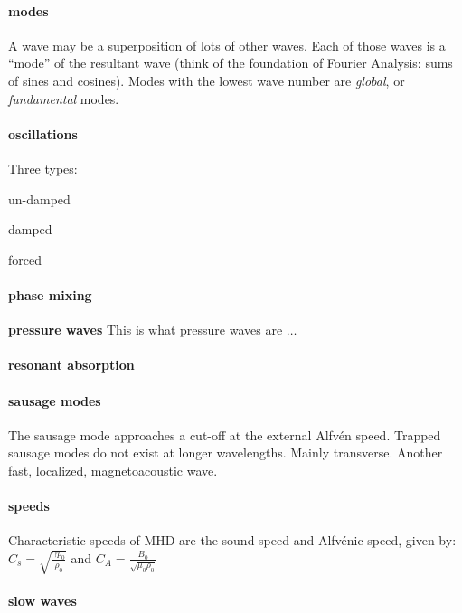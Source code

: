 \documentclass[12pt]{article}
\begin{document}
\paragraph{modes}
A wave may be a superposition of lots of other waves. Each of those
waves is a ``mode'' of the resultant wave (think of the foundation
of Fourier Analysis: sums of sines and cosines).
Modes with the lowest wave number are \emph{global}, or
\emph{fundamental} modes.


\paragraph{oscillations}
Three types:
\begin{enumerate*}
    \item un-damped
    \item damped
    \item forced
\end{enumerate*}

\paragraph{phase mixing}

\textbf{pressure waves}
This is what pressure waves are $\ldots$

\paragraph{resonant absorption}

\paragraph{sausage modes}
The sausage mode approaches a cut-off at the external Alfv\'en speed.
Trapped sausage modes do not exist at longer wavelengths.
Mainly transverse. Another fast, localized, magnetoacoustic wave.

\paragraph{speeds}
Characteristic speeds of MHD are the sound speed and Alfv\'enic speed,
given by:
$ C_s = \sqrt{\frac{\gamma p_0}{\rho_0}} $ and
$ C_A = \frac{B_0}{\sqrt{\mu_0\rho_0}} $


\paragraph{slow waves}
\end{document}
